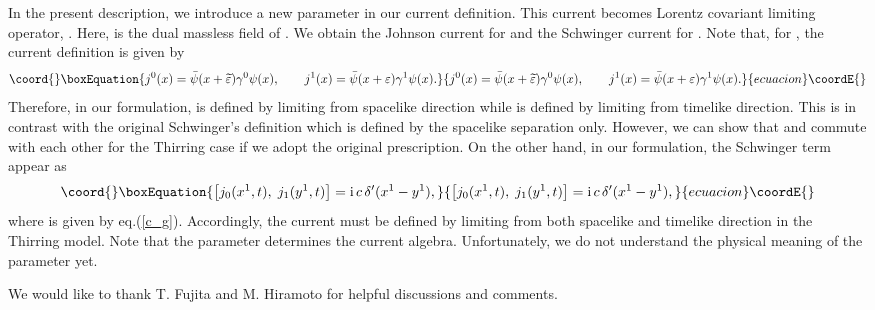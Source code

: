 \documentclass[a4paper,fleqn]{article}
\begin{document}
In the present description, we introduce a new parameter \myHighlight{$\sigma$}\coordHE{} in our current definition.
This current becomes Lorentz covariant limiting operator,
 \coordHE{}. 
Here, \myHighlight{$\widetilde\varphi$}\coordHE{} is the dual massless field of \myHighlight{$\varphi$}\coordHE{}\cite{abd2_rot}.
We obtain the Johnson current for \coordHE{} and the Schwinger current for \coordHE{}. 
Note that, for \coordHE{}, the current definition is given by
\begin{equation}\coord{}\boxEquation{
j^0 (x) = \bar{\psi}(x+\widetilde\varepsilon) \gamma^0 \psi(x), \quad \quad
j^1 (x) = \bar{\psi}(x+\varepsilon) \gamma^1 \psi(x).
}{
j^0 (x) = \bar{\psi}(x+\widetilde\varepsilon) \gamma^0 \psi(x), \quad \quad
j^1 (x) = \bar{\psi}(x+\varepsilon) \gamma^1 \psi(x).
}{ecuacion}\coordE{}\end{equation}
Therefore, in our formulation, \coordHE{} is defined by limiting from spacelike direction
while \coordHE{} is defined by limiting from timelike direction.
This is in contrast with the original Schwinger's definition \cite{sch59} which 
is defined by the spacelike separation only.
 However, we can show that \coordHE{} and \coordHE{} commute with each other for the Thirring case
 if we adopt the original prescription.
On the other hand, in our formulation, the Schwinger term \cite{got_ima,sch59} appear as
\begin{equation}\coord{}\boxEquation{
\left[j_0(x^1,t), \;j_1(y^1, t) \right] = {\rm i} \,c \, \delta^\prime (x^1 - y^1),
}{
\left[j_0(x^1,t), \;j_1(y^1, t) \right] = {\rm i} \,c \, \delta^\prime (x^1 - y^1),
}{ecuacion}\coordE{}\end{equation}
where \coordHE{} is given by eq.(\ref{c_g}).
Accordingly, the current must be defined by limiting from both spacelike and 
timelike direction in the Thirring model. Note that the parameter \myHighlight{$\sigma$}\coordHE{} determines
the current algebra.
Unfortunately, we do not understand the physical meaning of the parameter \myHighlight{$\sigma$}\coordHE{} yet.

\vspace{1cm}
\hspace{-5mm}{\bf ACKNOWLEDGMENTS}

\vspace{5mm}
We would like to thank T. Fujita and M. Hiramoto for helpful discussions and comments.
\end{document}
